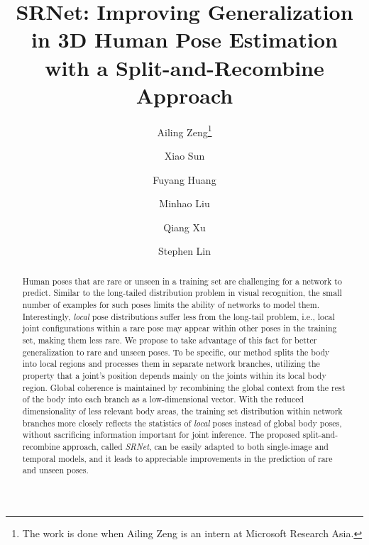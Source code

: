 \documentclass[runningheads]{llncs}
\begin{document}
\pagestyle{headings}
\mainmatter
\def\ECCVSubNumber{2201}  

\title{SRNet: Improving Generalization in 3D Human Pose Estimation with a Split-and-Recombine Approach}
\begin{comment}
\titlerunning{ECCV-20 submission ID \ECCVSubNumber} 
\authorrunning{ECCV-20 submission ID \ECCVSubNumber} 
\author{Anonymous ECCV submission}
\institute{Paper ID \ECCVSubNumber}
\end{comment}



\author{Ailing Zeng\thanks{The work is done when Ailing Zeng is an intern at Microsoft
Research Asia.} \and
Xiao Sun\and
Fuyang Huang \and Minhao Liu \and Qiang Xu \and Stephen Lin }
\maketitle

\begin{abstract}
Human poses that are rare or unseen in a training set are challenging for a network to predict. Similar to the long-tailed distribution problem in visual recognition, the small number of examples for such poses limits the ability of networks to model them. Interestingly, {\em local} pose distributions suffer less from the long-tail problem, i.e., local joint configurations within a rare pose may appear within other poses in the training set, making them less rare. We propose to take advantage of this fact for better generalization to rare and unseen poses. To be specific, our method splits the body into local regions and processes them in separate network branches, utilizing the property that a joint’s position depends mainly on the joints within its local body region. Global coherence is maintained by recombining the global context from the rest of the body into each branch as a low-dimensional vector. With the reduced dimensionality of less relevant body areas, the training set distribution within network branches more closely reflects the statistics of {\em local} poses instead of global body poses, without sacrificing information important for joint inference. The proposed split-and-recombine approach, called {\em SRNet}, can be easily adapted to both single-image and temporal models, and it leads to appreciable improvements in the prediction of rare and unseen poses.
\end{abstract}
\end{document}
